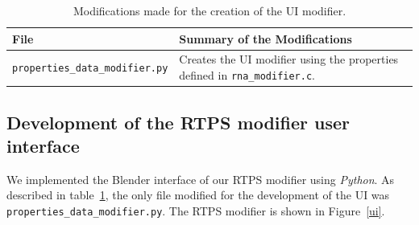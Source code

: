 \vspace{16pt}
\begin{table}[htdp]
\caption{Modifications made for the creation of the UI modifier.}
\begin{center}
\begin{tabular}{|p{6cm}|p{6cm}|}
\hline 
\textbf{File} & \textbf{Summary of the Modifications} \\\hline 
\texttt{properties\_data\_modifier.py} & Creates the UI modifier using the properties defined in \texttt{rna\_modifier.c}. \\
\hline 
\end{tabular}
\end{center}
\label{uiTable}
\end{table}

\subsection{Development of the RTPS modifier user interface}
We implemented the Blender interface of our RTPS modifier using \textit{Python}. As described in table~\ref{uiTable}, the only file modified for the development of the UI was \texttt{properties\_data\_modifier.py}. The RTPS modifier is shown in Figure~\ref{ui}.

